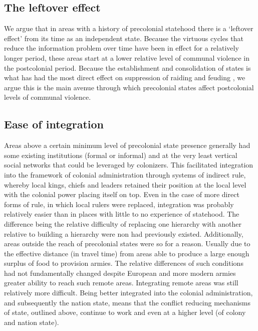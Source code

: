\documentclass[12pt]{article}
\begin{document}
\subsection{The leftover effect}

We argue that in areas with a history of precolonial statehood there is a
`leftover effect' from its time as an independent state. Because the virtuous
cycles that reduce the information problem over time have been in effect for a
relatively longer period, these areas start at a lower relative level of
communal violence in the postcolonial period. Because the establishment and
consolidation of states is what has had the most direct effect on suppression of
raiding and feuding \citep{Pinker2012}, we argue this is the main avenue through
which precolonial states affect postcolonial levels of communal violence.


\subsection{Ease of integration}

Areas above a certain minimum level of precolonial state presence generally had
some existing institutions (formal or informal) and at the very least vertical
social networks that could be leveraged by colonizers. This facilitated
integration into the framework of colonial administration through systems of
indirect rule, whereby local kings, chiefs and leaders retained their position
at the local level with the colonial power placing itself on top. Even in the
case of more direct forms of rule, in which local rulers were replaced,
integration was probably relatively easier than in places with little to no
experience of statehood. The difference being the relative difficulty of
replacing one hierarchy with another relative to building a hierarchy were non
had previously existed. Additionally, areas outside the reach of precolonial
states were so for a reason. Usually due to the effective distance (in travel
time) from areas able to produce a large enough surplus of food to provision
armies. The relative differences of such conditions had not fundamentally
changed despite European and more modern armies greater ability to reach such
remote areas. Integrating remote areas was still relatively more difficult.
Being better integrated into the colonial administration, and subsequently the
nation state, means that the conflict reducing mechanisms of state, outlined
above, continue to work and even at a higher level (of colony and nation state).
\end{document}
